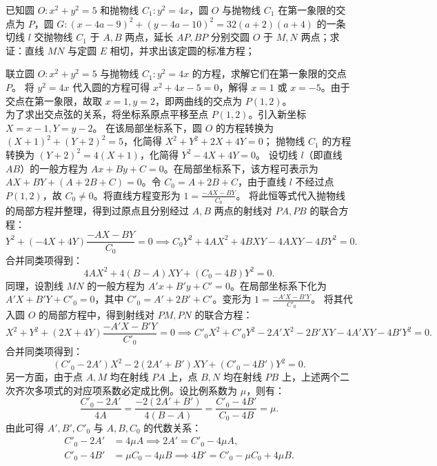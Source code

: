 \begin{solution}
\end{solution}



\begin{example}
已知圆 \(O: x^2 + y^2 = 5\) 和抛物线 \(C_1: y^2 = 4x\)，圆 \(O\) 与抛物线 \(C_1\) 在第一象限的交点为 \(P\)，圆 \(G: (x - 4a - 9)^2 + (y - 4a - 10)^2 = 32(a + 2)(a + 4)\) 的一条切线 \(l\) 交抛物线 \(C_1\) 于 \(A,B\) 两点，延长 \(AP,BP\) 分别交圆 \(O\) 于 \(M,N\) 两点；求证：直线 \(MN\) 与定圆 \(E\) 相切，并求出该定圆的标准方程；
\end{example}
\begin{solution}
联立圆 $O: x^2 + y^2 = 5$ 与抛物线 $C_1: y^2 = 4x$ 的方程，求解它们在第一象限的交点 $P$。
将 $y^2 = 4x$ 代入圆的方程可得 $x^2 + 4x - 5 = 0$，解得 $x = 1$ 或 $x = -5$。由于交点在第一象限，故取 $x = 1, y = 2$，即两曲线的交点为 $P(1, 2)$。\\
为了求出交点弦的关系，将坐标系原点平移至点 $P(1, 2)$。引入新坐标 $X = x - 1, Y = y - 2$。
在该局部坐标系下，圆 $O$ 的方程转换为 $(X+1)^2 + (Y+2)^2 = 5$，化简得 $X^2 + Y^2 + 2X + 4Y = 0$；
抛物线 $C_1$ 的方程转换为 $(Y+2)^2 = 4(X+1)$，化简得 $Y^2 - 4X + 4Y = 0$。
设切线 $l$（即直线 $AB$）的一般方程为 $Ax + By + C = 0$。在局部坐标系下，该方程可表示为 $AX + BY + (A + 2B + C) = 0$。令 $C_0 = A + 2B + C$，由于直线 $l$ 不经过点 $P(1,2)$，故 $C_0 \neq 0$。将直线方程变形为 $1 = \frac{-AX - BY}{C_0}$。
将此恒等式代入抛物线的局部方程并整理，得到过原点且分别经过 $A, B$ 两点的射线对 $PA, PB$ 的联合方程：
\[ Y^2 + (-4X + 4Y)\frac{-AX - BY}{C_0} = 0 \implies C_0 Y^2 + 4AX^2 + 4BXY - 4AXY - 4BY^2 = 0. \]
合并同类项得到：
\[ 4AX^2 + 4(B - A)XY + (C_0 - 4B)Y^2 = 0. \]
同理，设割线 $MN$ 的一般方程为 $A'x + B'y + C' = 0$。在局部坐标系下化为 $A'X + B'Y + C'_0 = 0$，其中 $C'_0 = A' + 2B' + C'$。变形为 $1 = \frac{-A'X - B'Y}{C'_0}$。
将其代入圆 $O$ 的局部方程中，得到射线对 $PM, PN$ 的联合方程：
\[ X^2 + Y^2 + (2X + 4Y)\frac{-A'X - B'Y}{C'_0} = 0 \implies C'_0 X^2 + C'_0 Y^2 - 2A'X^2 - 2B'XY - 4A'XY - 4B'Y^2 = 0. \]
合并同类项得到：
\[ (C'_0 - 2A')X^2 - 2(2A' + B')XY + (C'_0 - 4B')Y^2 = 0. \]
另一方面，由于点 $A, M$ 均在射线 $PA$ 上，点 $B, N$ 均在射线 $PB$ 上，上述两个二次齐次多项式的对应项系数必定成比例。设比例系数为 $\mu$，则有：
\[ \frac{C'_0 - 2A'}{4A} = \frac{-2(2A' + B')}{4(B - A)} = \frac{C'_0 - 4B'}{C_0 - 4B} = \mu. \]
由此可得 $A', B', C'_0$ 与 $A, B, C_0$ 的代数关系：
\begin{align*}
C'_0 - 2A' &= 4\mu A \implies 2A' = C'_0 - 4\mu A, \\
C'_0 - 4B' &= \mu C_0 - 4\mu B \implies 4B' = C'_0 - \mu C_0 + 4\mu B.

\end{align*}
\end{solution}
